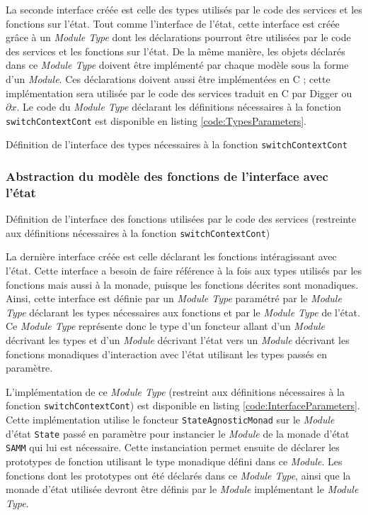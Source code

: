 			La seconde interface créée est celle des types utilisés par le code des services et les fonctions sur l'état. Tout comme l'interface de l'état, cette interface est créée grâce à un \emph{Module Type} dont les déclarations pourront être utilisées par le code des services et les fonctions sur l'état. De la même manière, les objets déclarés dans ce \emph{Module Type} doivent être implémenté par chaque modèle sous la forme d'un \emph{Module}. Ces déclarations doivent aussi être implémentées en C ; cette implémentation sera utilisée par le code des services traduit en C par Digger ou $\partial x$. Le code du \emph{Module Type} déclarant les définitions nécessaires à la fonction \texttt{switchContextCont} est disponible en listing \ref{code:TypesParameters}.

			\begin{listing}[!ht]
				\caption{Définition de l'interface des types nécessaires à la fonction \texttt{switchContextCont}}
				\label{code:TypesParameters}
			\end{listing}


			\subsubsection{Abstraction du modèle des fonctions de l'interface avec l'état}

			\begin{listing}[!ht]
				\caption{Définition de l'interface des fonctions utilisées par le code des services (restreinte aux définitions nécessaires à la fonction \texttt{switchContextCont})}
				\label{code:InterfaceParameters}
			\end{listing}
			La dernière interface créée est celle déclarant les fonctions intéragissant avec l'état. Cette interface a besoin de faire référence à la fois aux types utilisés par les fonctions mais aussi à la monade, puisque les fonctions décrites sont monadiques. Ainsi, cette interface est définie par un \emph{Module Type} paramétré par le \emph{Module Type} déclarant les types nécessaires aux fonctions et par le \emph{Module Type} de l'état. Ce \emph{Module Type} représente donc le type d'un foncteur allant d'un \emph{Module} décrivant les types et d'un \emph{Module} décrivant l'état vers un \emph{Module} décrivant les fonctions monadiques d'interaction avec l'état utilisant les types passés en paramètre.

			L'implémentation de ce \emph{Module Type} (restreint aux définitions nécessaires à la fonction \texttt{switchContextCont}) est disponible en listing \ref{code:InterfaceParameters}. Cette implémentation utilise le foncteur \texttt{StateAgnosticMonad} sur le \emph{Module} d'état \texttt{State} passé en paramètre pour instancier le \emph{Module} de la monade d'état \texttt{SAMM} qui lui est nécessaire. Cette instanciation permet ensuite de déclarer les prototypes de fonction utilisant le type monadique défini dans ce \emph{Module}. Les fonctions dont les prototypes ont été déclarés dans ce \emph{Module Type}, ainsi que la monade d'état utilisée devront être définis par le \emph{Module} implémentant le \emph{Module Type}.

